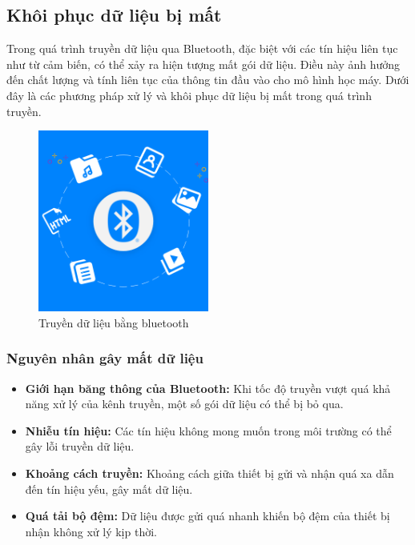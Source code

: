 \subsection{Khôi phục dữ liệu bị mất}

Trong quá trình truyền dữ liệu qua Bluetooth, đặc biệt với các tín hiệu liên tục như từ cảm biến, có thể xảy ra hiện tượng mất gói dữ liệu. Điều này ảnh hưởng đến chất lượng và tính liên tục của thông tin đầu vào cho mô hình học máy. Dưới đây là các phương pháp xử lý và khôi phục dữ liệu bị mất trong quá trình truyền.

\begin{figure}[H]
    \centering
    \includegraphics[width=0.5\textwidth,height=\textheight,keepaspectratio]{Images/Improved methods/bluetooth.png}
    \caption{Truyền dữ liệu bằng bluetooth}
    \label{fig:enter-label}
\end{figure}

\subsubsection{Nguyên nhân gây mất dữ liệu}
\begin{itemize}
    \item \textbf{Giới hạn băng thông của Bluetooth:} Khi tốc độ truyền vượt quá khả năng xử lý của kênh truyền, một số gói dữ liệu có thể bị bỏ qua.
    \item \textbf{Nhiễu tín hiệu:} Các tín hiệu không mong muốn trong môi trường có thể gây lỗi truyền dữ liệu.
    \item \textbf{Khoảng cách truyền:} Khoảng cách giữa thiết bị gửi và nhận quá xa dẫn đến tín hiệu yếu, gây mất dữ liệu.
    \item \textbf{Quá tải bộ đệm:} Dữ liệu được gửi quá nhanh khiến bộ đệm của thiết bị nhận không xử lý kịp thời.
\end{itemize}

